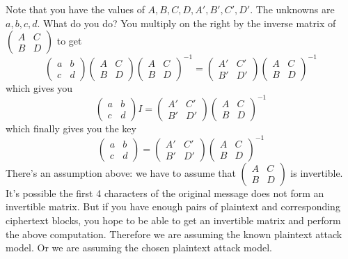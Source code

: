 Note that you have the values of $A,B,C,D,A',B',C',D'$.
The unknowns are $a,b,c,d$.
What do you do?
You multiply on the right by the inverse matrix of
$\begin{pmatrix}
  A & C \\
  B & D 
\end{pmatrix}
$
to get
\[
\begin{pmatrix}
  a & b \\
  c & d 
\end{pmatrix}
\begin{pmatrix}
  A & C \\
  B & D 
\end{pmatrix}
\begin{pmatrix}
  A & C \\
  B & D 
\end{pmatrix}^{-1}
=
\begin{pmatrix}
  A' & C' \\
  B' & D'
\end{pmatrix}
\begin{pmatrix}
  A & C \\
  B & D 
\end{pmatrix}^{-1}
\]
which gives you
\[
\begin{pmatrix}
  a & b \\
  c & d 
\end{pmatrix}
I
=
\begin{pmatrix}
  A' & C' \\
  B' & D'
\end{pmatrix}
\begin{pmatrix}
  A & C \\
  B & D 
\end{pmatrix}^{-1}
\]
which finally gives you the key
\[
\begin{pmatrix}
  a & b \\
  c & d 
\end{pmatrix}
=
\begin{pmatrix}
  A' & C' \\
  B' & D'
\end{pmatrix}
\begin{pmatrix}
  A & C \\
  B & D 
\end{pmatrix}^{-1}
\]
There's an assumption above:
we have to assume that
$
\begin{pmatrix}
  A & C \\
  B & D 
\end{pmatrix}
$
is invertible.
It's possible the first 4 characters of the original message
does not form an invertible matrix.
But if you have enough pairs of plaintext and corresponding ciphertext blocks,
you hope to be able to get an invertible matrix and perform
the above computation.
Therefore we are assuming the known plaintext attack model.
Or we are assuming the chosen plaintext attack model.
